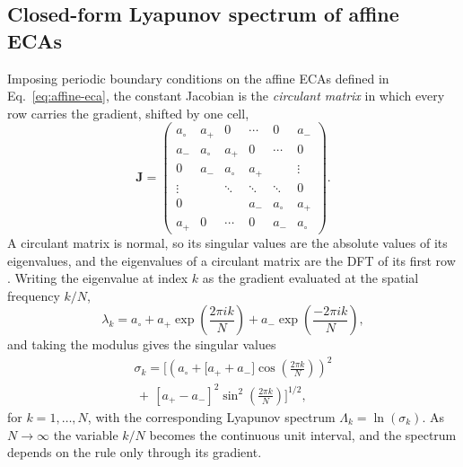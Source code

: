 \documentclass[a4paper,fleqn]{cas-dc}
\begin{document}
\subsection{Closed-form Lyapunov spectrum of affine ECAs}

Imposing periodic boundary conditions on the affine ECAs defined in Eq.~\eqref{eq:affine-eca}, the constant Jacobian is the \emph{circulant matrix} in which every row carries the gradient, shifted by one cell,
\begin{equation}
    \label{eq:circulant-J}
    \mathbf{J}=
    \begin{pmatrix}
    a_\circ     & a_+       & 0         & \cdots    & 0         & a_-\\
    a_-         & a_\circ   & a_+       & 0         & \cdots    & 0\\
    0           & a_-       & a_\circ   & a_+       &           & \vdots\\
    \vdots      &           & \ddots    & \ddots    & \ddots    & 0\\
    0           &           &           & a_-       & a_\circ   & a_+\\
    a_+         & 0         & \cdots    & 0         & a_-       & a_\circ
    \end{pmatrix}.
\end{equation}
A circulant matrix is normal, so its singular values are the absolute values of its eigenvalues, and the eigenvalues of a circulant matrix are the DFT of its first row \cite{davis1979circulant}. Writing the eigenvalue at index $k$ as the gradient evaluated at the spatial frequency $k/N$,
\begin{equation}
    \label{eq:eca-exp}
    \lambda_k=a_\circ + a_+\exp\left(\frac{2\pi i k}{N}\right) + a_- \exp\left(\frac{-2\pi i k}{N}\right),
\end{equation}
and taking the modulus gives the singular values
\begin{equation}
    \label{eq:eca-singular-values}
    \begin{split}
    \sigma_k=\Biggl[\left(a_\circ
    +\bigl[a_+ + a_-\bigr]
    \cos\!\left(\frac{2\pi k}{N}\right)\right)^{2}\\
    \,+\,\left[a_+ - a_-\right]^{2}
    \sin^{2}\!\left(\frac{2\pi k}{N}\right)\Biggr]^{1/2},
    \end{split}
\end{equation}
for $k=1,\dots,N$, with the corresponding Lyapunov spectrum $\Lambda_k=\ln(\sigma_k)$. As $N\to\infty$ the variable $k/N$ becomes the continuous unit interval, and the spectrum depends on the rule only through its gradient.
\end{document}
